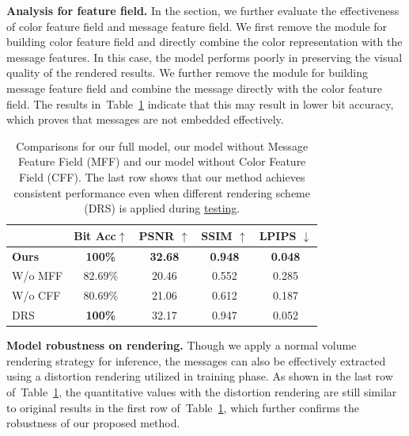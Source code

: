 \documentclass[10pt,twocolumn,letterpaper]{article}
\newcommand{\Tref}[1]{Table~\ref{#1}}
\begin{document}
\noindent\textbf{Analysis for feature field.}
\label{sec:5.3}
In the section, we further evaluate the effectiveness of color feature field and message feature field. We first remove the module for building color feature field and directly combine the color representation with the message features. In this case, the model performs poorly in preserving the visual quality of the rendered results. We further remove the module for building message feature field and combine the message directly with the color feature field. The results in~\Tref{tab:ablationstudy} indicate that this may result in lower bit accuracy, which proves that messages are not embedded effectively. 

\begin{table}[tb]
 \caption{Comparisons for our full model, our model without Message Feature Field (MFF) and our model without Color Feature Field (CFF). The last row shows that our method achieves consistent performance even when different rendering scheme (DRS) is applied during \underline{testing}. }
 \label{tab:comparison4}
 \centering
 \begin{tabular}{l|cccc}
    \toprule
         &Bit Acc$\uparrow$& PSNR $\uparrow$& SSIM $\uparrow$& LPIPS $\downarrow$ \\
    \midrule
    \textbf{Ours} & \textbf{100\%} & \textbf{32.68} & \textbf{0.948} & \textbf{0.048}  \\
    W/o MFF& 82.69\% & 20.46 & 0.552 & 0.285     \\
    W/o CFF& 80.69\% & 21.06 & 0.612 & 0.187     \\
    DRS  & \textbf{100\%}  & 32.17 & 0.947 & 0.052   \\
    \bottomrule
\end{tabular}
\label{tab:ablationstudy}
      \vspace{-12pt}
 \end{table}
\noindent\textbf{Model robustness on rendering.}
Though we apply a normal volume rendering strategy for inference, the messages can also be effectively extracted using a distortion rendering utilized in training phase. As shown in the last row of~\Tref{tab:ablationstudy}, the quantitative values with the distortion rendering are still similar to original results in the first row of~\Tref{tab:ablationstudy}, which further confirms the robustness of our proposed method.
\end{document}
